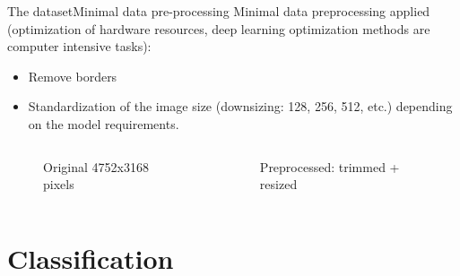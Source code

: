 \documentclass{beamer}
\begin{document}
\begin{frame}{The dataset}{Minimal data pre-processing}
Minimal data preprocessing applied (optimization of hardware resources, deep learning optimization methods are computer intensive tasks): 
\begin{itemize}
\item Remove borders
\item Standardization of the image size (downsizing: 128, 256, 512, etc.) depending on the model requirements.
\end{itemize}

\begin{columns}
\begin{column}{0.5\textwidth}
\begin{figure}[p]
\caption{Original 4752x3168 pixels}
\end{figure}	
\end{column}
\begin{column}{0.31\textwidth}  %
\begin{figure}[p]
\caption{Preprocessed: trimmed + resized}
\end{figure}
\end{column}
\end{columns}	
\end{frame}


\part{Classification}
\end{document}

